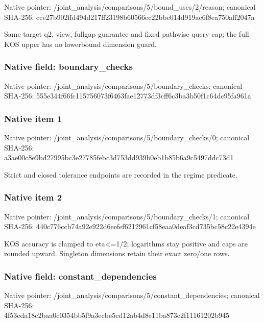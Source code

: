 \documentclass[10pt,a4paper]{article}
\begin{document}
Native pointer: /joint\_analysis/comparis\allowbreak{}ons/5/bound\_uses/2/reaso\allowbreak{}n; canonical SHA-256: cce27b902ffd494d217ff231\allowbreak{}98b60566ec22bbe014d919ac\allowbreak{}6f8ea750aff2047a


Same target q2, view, fullgap guarantee and fixed pathwise query cap; the full KOS upper has no lowerbound dimension guard.


\subsubsection{Native field: boundary\_checks}


Native pointer: /joint\_analysis/comparis\allowbreak{}ons/5/boundary\_checks; canonical SHA-256: 555e344f66fc115756073f64\allowbreak{}63fae12773df3cff6c3ba3b5\allowbreak{}0f1c64dc95fa961a



\subsubsection{Native item 1}


Native pointer: /joint\_analysis/comparis\allowbreak{}ons/5/boundary\_checks/0; canonical SHA-256: a3ae00c8e9bd27995bc3e277\allowbreak{}85febc3d753dd939b0eb1b85\allowbreak{}b6a9c5497ddc73d1


Strict and closed tolerance endpoints are recorded in the regime predicate.


\subsubsection{Native item 2}


Native pointer: /joint\_analysis/comparis\allowbreak{}ons/5/boundary\_checks/1; canonical SHA-256: 440c776ccb74a92e922d6eef\allowbreak{}ef6212961cf58eaa0deaf3cd\allowbreak{}735bc58c22e4394e


KOS accuracy is clamped to eta<=1/2; logarithms stay positive and caps are rounded upward. Singleton dimensions retain their exact zero/one rows.


\subsubsection{Native field: constant\_dependencies}


Native pointer: /joint\_analysis/comparis\allowbreak{}ons/5/constant\_dependenc\allowbreak{}ies; canonical SHA-256: 4f53cda18c2baa0c0354bb5f\allowbreak{}9a3ecbe5ed12ab4d8e11ba87\allowbreak{}3c2f11161202b945
\end{document}
